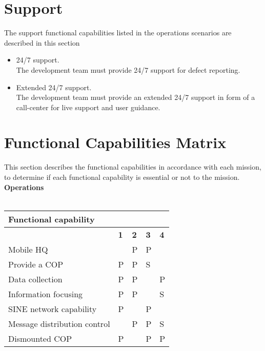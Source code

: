 \section{Support}
The support functional capabilities listed in the operations scenarios are described in this section
\begin{itemize}
	\item 24/7 support.\\
	The development team must provide 24/7 support for defect reporting.
	\item Extended 24/7 support.\\
	The development team must provide an extended 24/7 support in form of a call-center for live support and user guidance.
\end{itemize}


\section{Functional Capabilities Matrix}
This section describes the functional capabilities in accordance with each mission, to determine if each functional capability is essential or not to the mission. \\

\noindent \textbf{Operations}\\\\
\def\arraystretch{1.5}
\noindent\begin{tabular}{|>{}p{4.8cm}|>{\centering\arraybackslash}p{1.5cm}|>{\centering\arraybackslash}p{1.5cm}|>{\centering\arraybackslash}p{1.5cm}|>{\centering\arraybackslash}p{1.5cm}|}
	\hline \textbf{Functional capability} &  \multicolumn{4}{c}{\textbf{Missions}} \vline \\ 
	\hline  							& \textbf{1} & \textbf{2} & \textbf{3} & \textbf{4} \\ 
	\hline Mobile HQ 					&  & P & P &  \\ 
	\hline Provide a COP 				& P & P & S &  \\ 
	\hline Data collection 				& P & P &  & P \\ 
	\hline Information focusing 		& P & P &  & S \\ 
	\hline SINE network capability 		& P &  & P &  \\ 
	\hline Message distribution control &  & P & P & S \\ 
	\hline Dismounted COP 				& P &  & P & P \\ 
	\hline 
\end{tabular}

